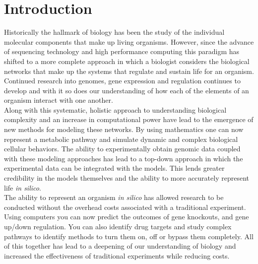 
\chapter{Introduction} %

\label{Chapter1} %


\newcommand{\keyword}[1]{\textbf{#1}}
\newcommand{\tabhead}[1]{\textbf{#1}}
\newcommand{\code}[1]{\texttt{#1}}
\newcommand{\file}[1]{\texttt{\bfseries#1}}
\newcommand{\option}[1]{\texttt{\itshape#1}}
\indent\indent Historically the hallmark of biology has been the study of the individual molecular components that make up living organisms. However, since the advance of sequencing technology and high performance computing this paradigm has shifted to a more complete approach in which a biologist considers the biological networks that make up the systems that regulate and sustain life for an organism.  Continued research into genomes, gene expression and regulation continues to develop and with it so does our understanding of how each of the elements of an organism interact with one another.  \\
%
%
\indent Along with this systematic, holistic approach to understanding biological complexity and an increase in computational power have lead to the emergence of new methods for modeling these networks.  By using mathematics one can now represent a metabolic pathway and simulate dynamic and complex biological cellular behaviors. The ability to experimentally obtain genomic data coupled with these modeling approaches has lead to a top-down approach in which the experimental data can be integrated with the models.  This lends greater credibility in the models themselves and the ability to more accurately represent life \textit{in silico}.\\
\indent The ability to represent an organism \textit{in silico} has allowed research to be conducted without the overhead costs associated with a traditional experiment. Using computers you can now predict the outcomes of gene knockouts, and gene up/down regulation. You can also identify drug targets and study complex pathways to identify methods to turn them on, off or bypass them completely.  All of this together has lead to a deepening of our understanding of biology and increased the effectiveness of traditional experiments while reducing costs.\\
